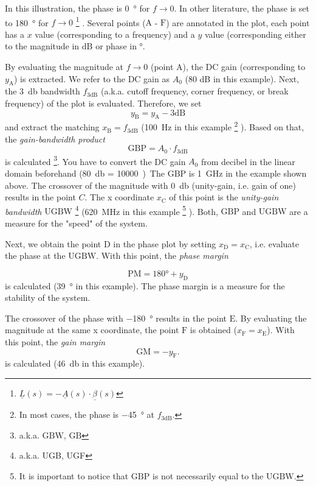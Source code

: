 \documentclass{article}[11pt]
\begin{document}
In this illustration, the phase is \SI{0}{\degree} for $f \rightarrow 0$.
In other literature, the phase is set to \SI{180}{\degree} for 
$f \rightarrow 0$%
\footnote{$\underline{L}(s) = -\underline{A}(s) \cdot \underline{\beta}(s)$}
.
Several points ($\mathrm{A}$ - $\mathrm{F}$) are annotated in the plot, each 
point has a $x$ value (corresponding to a frequency) and a $y$ value 
(corresponding either to the magnitude in dB or phase in \si{\degree}.

\medskip

By evaluating the magnitude at $f \rightarrow 0$ (point $\mathrm{A}$), the
DC gain (corresponding to $y_{\mathrm{A}}$) is extracted.
We refer to the DC gain as $A_0$ (80 dB in this example).
Next, the \SI{3}{\decibel} bandwidth $f_{\mathrm{3dB}}$ 
(a.k.a. cutoff frequency, corner frequency, or break frequency) of the
plot is evaluated. 
Therefore, we set
$$
y_{\mathrm{B}} = y_{\mathrm{A}} - 3 \mathrm{dB}
$$
and extract the matching $x_{\mathrm{B}} = f_{\mathrm{3dB}}$ 
(\SI{100}{\hertz} in this example%
\footnote{In most cases, the phase is \SI{-45}{\degree} at
$f_{\mathrm{3dB}}$.}
).
Based on that, the \textit{gain-bandwidth product}
\begin{equation}
\mathrm{GBP} = A_0 \cdot f_{\mathrm{3dB}}
\end{equation}
is calculated%
\footnote{a.k.a. $\mathrm{GBW}$, $\mathrm{GB}$}. 
You have to convert the DC gain $A_0$ from decibel in the linear domain 
beforehand (\SI{80}{\decibel} = \qty{10000}).
The $\mathrm{GBP}$ is \SI{1}{\giga\hertz} in the example shown above.
The crossover of the magnitude with \SI{0}{\decibel} 
(unity-gain, i.e. gain of one) results in the point $C$.
The x coordinate $x_{\mathrm{C}}$ of this point is the 
\textit{unity-gain bandwidth}
$\mathrm{UGBW}$%
\footnote{a.k.a. UGB, UGF}
(\SI{620}{\mega\hertz} in this example%
\footnote{It is important to notice that $\mathrm{GBP}$ is not necessarily
equal to the $\mathrm{UGBW}$.}
).
Both, $\mathrm{GBP}$ and $\mathrm{UGBW}$ are a measure for the "speed" of
the system.

\medskip

Next, we obtain the point $\mathrm{D}$ in the phase plot by setting 
$x_{\mathrm{D}} = x_{\mathrm{C}}$, i.e. evaluate the phase at the 
$\mathrm{UGBW}$.
With this point, the \textit{phase margin}

$$
\mathrm{PM} = 180° + y_{\mathrm{D}}
$$
is calculated (\SI{39}{\degree} in this example).
The phase margin is a measure for the stability of the system.

The crossover of the phase with \SI{-180}{\degree} results in the 
point $\mathrm{E}$.
By evaluating the magnitude at the same x coordinate, the point 
$\mathrm{F}$ is obtained ($x_{\mathrm{F}} = x_{\mathrm{E}}$).
With this point, the \textit{gain margin}
$$
\mathrm{GM} = - y_{\mathrm{F}}.
$$
is calculated (\SI{46}{\decibel} in this example).

\printbibliography
\end{document}
